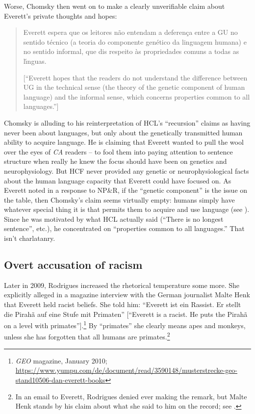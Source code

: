 \documentclass[output=paper,colorlinks,citecolor=brown
]{langscibook}
\begin{document}
Worse, Chomsky then went on to make a clearly unverifiable claim about
Everett's private thoughts and hopes:
\begin{quote}
Everett espera que os leitores n{\~a}o entendam a deferença entre a GU no
sentido t{\'e}cnico (a teoria do componente gen{\'e}tico da linguagem
humana) e no sentido informal, que dis respeito {\`a}s propriedades comuns
a todas as l{\'\i}nguas.

[``Everett hopes that the readers do not understand the difference between
UG in the technical sense (the theory of the genetic component of human
language) and the informal sense, which concerns properties common to all
languages.'']
\end{quote}
Chomsky is alluding to his reinterpretation of HCL's ``recursion'' claims
as having never been about languages, but only about the genetically
transmitted human ability to acquire language. He is claiming that
Everett wanted to pull the wool over the eyes of \textit{CA} readers
-- to fool them into paying attention to sentence structure when
really he knew the focus should have been on genetics and neurophysiology.
But HCF never provided any genetic or neurophysiological facts about the
human language capacity that Everett could have focused on. As Everett
noted in a response to NP\&R, if the ``genetic component'' is the issue
on the table, then Chomsky's claim seems virtually empty: humans simply
have whatever special thing it is that permits them to acquire and use
language (see \citealt[439]{Everett09}). Since he was motivated by what
HCL actually said (``There is no longest sentence'', etc.), he concentrated
on ``properties common to all languages.'' That isn't charlatanry.

\subsection{Overt accusation of racism}

Later in 2009, Rodrigues increased the rhetorical temperature some
more. She explicitly alleged in a magazine interview with the German
journalist Malte Henk that Everett held racist beliefs. She told him:
``Everett ist ein Rassist.  Er stellt die Pirah{\~a} auf eine Stufe mit
Primaten'' [``Everett is a racist. He puts the Pirah{\~a} on a level
with primates''].\footnote{%
   \textit{GEO} magazine, January 2010;
   \url{https://www.yumpu.com/de/document/read/3590148/musterstrecke-geo-stand10506-dan-everett-books}}
By ``primates'' she clearly means apes and monkeys, unless she has
forgotten that all humans are primates.\footnote{%
   In an email to Everett, Rodrigues denied ever making the remark,
   but Malte Henk stands by his claim about what she said to him on the
   record; see .}
\end{document}
